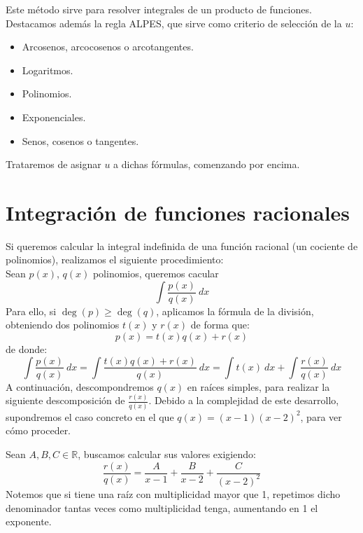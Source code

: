 \noindent
Este método sirve para resolver integrales de un producto de funciones.\\

\noindent
Destacamos además la regla ALPES\@, que sirve como criterio de selección de la $u$:
\begin{itemize}
    \item Arcosenos, arcocosenos o arcotangentes.
    \item Logaritmos.
    \item Polinomios.
    \item Exponenciales.
    \item Senos, cosenos o tangentes.
\end{itemize}
Trataremos de asignar $u$ a dichas fórmulas, comenzando por encima.

\section{Integración de funciones racionales}
Si queremos calcular la integral indefinida de una función racional (un cociente de polinomios), realizamos el siguiente procedimiento:\\

\noindent
Sean $p(x)$, $q(x)$ polinomios, queremos cacular
\begin{equation*}
    \displaystyle\int \frac{p(x)}{q(x)}~dx 
\end{equation*}
Para ello, si $\deg(p) \geq \deg(q)$, aplicamos la fórmula de la división, obteniendo dos polinomios $t(x)$ y $r(x)$ de forma que:
\begin{equation*}
    p(x) = t(x)q(x) + r(x)
\end{equation*}
de donde:
\begin{equation*}
    \displaystyle\int \frac{p(x)}{q(x)}~dx  = \displaystyle\int \frac{t(x)q(x)+r(x)}{q(x)}~dx = \displaystyle\int t(x)~dx  + \displaystyle\int \frac{r(x)}{q(x)}~dx 
\end{equation*}
A continuación, descompondremos $q(x)$ en raíces simples, para realizar la siguiente descomposición de $\frac{r(x)}{q(x)}$. Debido a la complejidad de este desarrollo, supondremos el caso concreto en el que $q(x) = (x-1){(x-2)}^2$, para ver cómo proceder.

Sean $A,B,C\in \mathbb{R}$, buscamos calcular sus valores exigiendo:
\begin{equation*}
    \dfrac{r(x)}{q(x)} = \dfrac{A}{x-1} + \dfrac{B}{x-2} + \dfrac{C}{{(x-2)}^{2}}
\end{equation*}
Notemos que si tiene una raíz con multiplicidad mayor que 1, repetimos dicho denominador tantas veces como multiplicidad tenga, aumentando en 1 el exponente.

